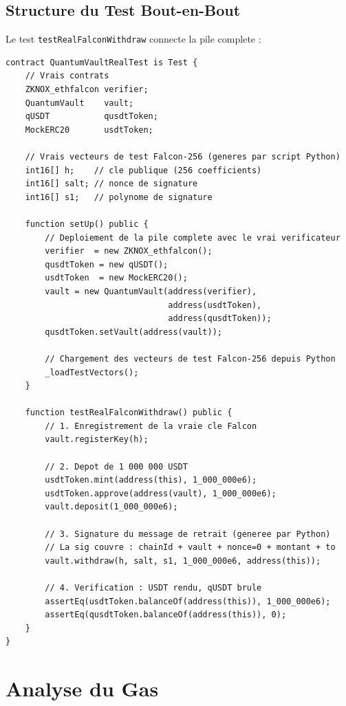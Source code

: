 \documentclass[11pt,a4paper]{article}
\begin{document}
\subsection{Structure du Test Bout-en-Bout}

Le test \texttt{testRealFalconWithdraw} connecte la pile complete :

\begin{lstlisting}[style=solidity, caption={QuantumVaultReal.t.sol (simplifie)}]
contract QuantumVaultRealTest is Test {
    // Vrais contrats
    ZKNOX_ethfalcon verifier;
    QuantumVault    vault;
    qUSDT           qusdtToken;
    MockERC20       usdtToken;

    // Vrais vecteurs de test Falcon-256 (generes par script Python)
    int16[] h;    // cle publique (256 coefficients)
    int16[] salt; // nonce de signature
    int16[] s1;   // polynome de signature

    function setUp() public {
        // Deploiement de la pile complete avec le vrai verificateur
        verifier  = new ZKNOX_ethfalcon();
        qusdtToken = new qUSDT();
        usdtToken  = new MockERC20();
        vault = new QuantumVault(address(verifier),
                                 address(usdtToken),
                                 address(qusdtToken));
        qusdtToken.setVault(address(vault));

        // Chargement des vecteurs de test Falcon-256 depuis Python
        _loadTestVectors();
    }

    function testRealFalconWithdraw() public {
        // 1. Enregistrement de la vraie cle Falcon
        vault.registerKey(h);

        // 2. Depot de 1 000 000 USDT
        usdtToken.mint(address(this), 1_000_000e6);
        usdtToken.approve(address(vault), 1_000_000e6);
        vault.deposit(1_000_000e6);

        // 3. Signature du message de retrait (generee par Python)
        // La sig couvre : chainId + vault + nonce=0 + montant + to
        vault.withdraw(h, salt, s1, 1_000_000e6, address(this));

        // 4. Verification : USDT rendu, qUSDT brule
        assertEq(usdtToken.balanceOf(address(this)), 1_000_000e6);
        assertEq(qusdtToken.balanceOf(address(this)), 0);
    }
}
\end{lstlisting}

\newpage
\section{Analyse du Gas}
\end{document}
